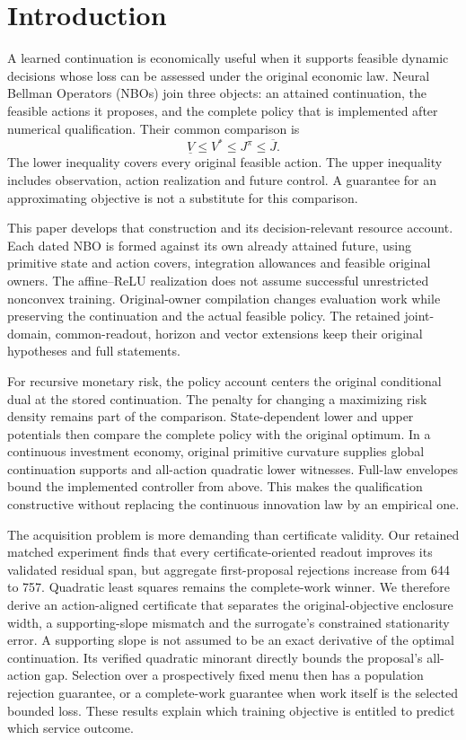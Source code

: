 \section{Introduction}\label{sec:introduction65}
A learned continuation is economically useful when it supports feasible dynamic decisions whose loss can be assessed under the original economic law. Neural Bellman Operators (NBOs) join three objects: an attained continuation, the feasible actions it proposes, and the complete policy that is implemented after numerical qualification. Their common comparison is
\[
 \underline V\le V^*\le J^{\widehat\pi}\le\overline J.
\]
The lower inequality covers every original feasible action. The upper inequality includes observation, action realization and future control. A guarantee for an approximating objective is not a substitute for this comparison.

This paper develops that construction and its decision-relevant resource account. Each dated NBO is formed against its own already attained future, using primitive state and action covers, integration allowances and feasible original owners. The affine--ReLU realization does not assume successful unrestricted nonconvex training. Original-owner compilation changes evaluation work while preserving the continuation and the actual feasible policy. The retained joint-domain, common-readout, horizon and vector extensions keep their original hypotheses and full statements.

For recursive monetary risk, the policy account centers the original conditional dual at the stored continuation. The penalty for changing a maximizing risk density remains part of the comparison. State-dependent lower and upper potentials then compare the complete policy with the original optimum. In a continuous investment economy, original primitive curvature supplies global continuation supports and all-action quadratic lower witnesses. Full-law envelopes bound the implemented controller from above. This makes the qualification constructive without replacing the continuous innovation law by an empirical one.

The acquisition problem is more demanding than certificate validity. Our retained matched experiment finds that every certificate-oriented readout improves its validated residual span, but aggregate first-proposal rejections increase from 644 to 757. Quadratic least squares remains the complete-work winner. We therefore derive an action-aligned certificate that separates the original-objective enclosure width, a supporting-slope mismatch and the surrogate's constrained stationarity error. A supporting slope is not assumed to be an exact derivative of the optimal continuation. Its verified quadratic minorant directly bounds the proposal's all-action gap. Selection over a prospectively fixed menu then has a population rejection guarantee, or a complete-work guarantee when work itself is the selected bounded loss. These results explain which training objective is entitled to predict which service outcome.

